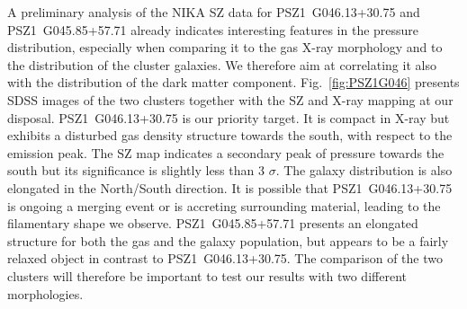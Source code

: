 \documentclass[11pt,a4paper,twoside,graphicx,color]{article}
\begin{document}
A preliminary analysis of the NIKA SZ data for PSZ1~G046.13+30.75 and PSZ1~G045.85+57.71 already indicates interesting features in the pressure distribution, especially when comparing it to the gas X-ray morphology and to the distribution of the cluster galaxies. We therefore aim at correlating it also with the distribution of the dark matter component.
Fig.~\ref{fig:PSZ1G046} presents SDSS images of the two clusters together with the SZ and X-ray mapping at our disposal. PSZ1~G046.13+30.75 is our priority target. It is compact in X-ray but exhibits a disturbed gas density structure towards the south, with respect to the emission peak. The SZ map indicates a secondary peak of pressure towards the south but its significance is slightly less than 3 $\sigma$. The galaxy distribution is also elongated in the North/South direction. It is possible that PSZ1~G046.13+30.75 is ongoing a merging event or is accreting surrounding material, leading to the filamentary shape we observe. PSZ1~G045.85+57.71 presents an elongated structure for both the gas and the galaxy population, but appears to be a fairly relaxed object in contrast to PSZ1~G046.13+30.75. The comparison of the two clusters will therefore be important to test our results with two different morphologies.

\end{document}

